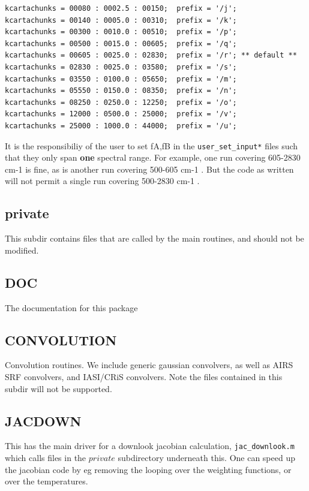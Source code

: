 \documentclass[11pt]{article}
\begin{document}
\begin{verbatim}
kcartachunks = 00080 : 0002.5 : 00150;  prefix = '/j';
kcartachunks = 00140 : 0005.0 : 00310;  prefix = '/k';
kcartachunks = 00300 : 0010.0 : 00510;  prefix = '/p';
kcartachunks = 00500 : 0015.0 : 00605;  prefix = '/q';
kcartachunks = 00605 : 0025.0 : 02830;  prefix = '/r'; ** default **
kcartachunks = 02830 : 0025.0 : 03580;  prefix = '/s';
kcartachunks = 03550 : 0100.0 : 05650;  prefix = '/m';
kcartachunks = 05550 : 0150.0 : 08350;  prefix = '/n';
kcartachunks = 08250 : 0250.0 : 12250;  prefix = '/o';
kcartachunks = 12000 : 0500.0 : 25000;  prefix = '/v';
kcartachunks = 25000 : 1000.0 : 44000;  prefix = '/u';
\end{verbatim}

It is the responsibiliy of the user to set fA,fB in the
\texttt{user\_set\_input*} files such that they only span \textbf{one} spectral range.
For example, one run covering 605-2830 cm-1 is fine, as is another run
covering 500-605 cm-1 . But the code as written will not permit a single
run covering 500-2830 cm-1 .

\subsection{private}
\label{sec-8-2}

This subdir contains files that are called by the main routines, and
should not be modified.

\subsection{DOC}
\label{sec-8-3}

The documentation for this package

\subsection{CONVOLUTION}
\label{sec-8-4}

Convolution routines. We include generic gaussian convolvers, as well as
AIRS SRF convolvers, and IASI/CRiS convolvers. Note the files contained
in this subdir will not be supported.

\subsection{JACDOWN}
\label{sec-8-5}

This has the main driver for a downlook jacobian calculation,
\texttt{jac\_downlook.m} which calls files in the $private$ subdirectory
underneath this. One can speed up the jacobian code by eg removing the
looping over the weighting functions, or over the temperatures.
\end{document}
